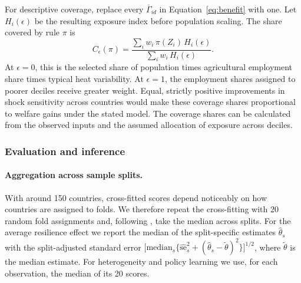 For descriptive coverage, replace every $\bar\Gamma_{id}$ in
Equation~\eqref{eq:benefit} with one. Let $H_i(\epsilon)$ be the resulting exposure index
before population scaling. The share covered by rule $\pi$ is
\begin{equation}\label{eq:coverage}
C_\epsilon(\pi)=
\frac{\sum_i w_i\,\pi(Z_i)\,H_i(\epsilon)}
     {\sum_i w_i\,H_i(\epsilon)}.
\end{equation}
At $\epsilon=0$, this is the selected share of population times agricultural employment
share times typical heat variability. At $\epsilon=1$, the employment shares assigned to
poorer deciles receive greater weight. Equal, strictly positive improvements in shock
sensitivity across countries would make these coverage shares proportional to welfare
gains under the stated model. The coverage shares can be calculated from the observed inputs
and the assumed allocation of exposure across deciles.

\subsubsection{Evaluation and inference}

\paragraph{Aggregation across sample splits.} With around 150 countries, cross-fitted scores depend
noticeably on how countries are assigned to folds. We therefore repeat the cross-fitting with 20
random fold assignments and, following \citet{chernozhukov2018}, take the median across splits. For
the average resilience effect we report the median of the split-specific estimates
$\hat\theta_s$ with the split-adjusted standard error
$\big[\mathrm{median}_s\{\widehat{\mathrm{se}}_s^2+(\hat\theta_s-\tilde\theta)^2\}\big]^{1/2}$, where
$\tilde\theta$ is the median estimate. For heterogeneity and policy learning we use, for each
observation, the median of its 20 scores.

